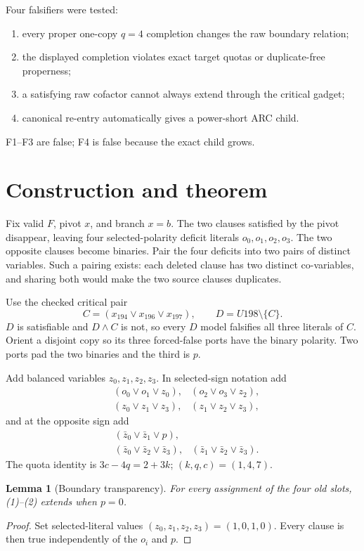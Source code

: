 \documentclass[11pt]{article}
\newtheorem{lemma}{Lemma}
\begin{document}
Four falsifiers were tested:
\begin{enumerate}[label=F\arabic*.]
\item every proper one-copy $q=4$ completion changes the raw boundary relation;
\item the displayed completion violates exact target quotas or duplicate-free properness;
\item a satisfying raw cofactor cannot always extend through the critical gadget;
\item canonical re-entry automatically gives a power-short ARC child.
\end{enumerate}
F1--F3 are false; F4 is false because the exact child grows.

\section{Construction and theorem}

Fix valid $F$, pivot $x$, and branch $x=b$.  The two clauses satisfied by the pivot disappear, leaving four selected-polarity deficit literals $o_0,o_1,o_2,o_3$.  The two opposite clauses become binaries.  Pair the four deficits into two pairs of distinct variables.  Such a pairing exists: each deleted clause has two distinct co-variables, and sharing both would make the two source clauses duplicates.

Use the checked critical pair
\[
C=(x_{194}\vee x_{196}\vee x_{197}),\qquad
D=U198\setminus\{C\}.
\]
$D$ is satisfiable and $D\wedge C$ is not, so every $D$ model falsifies all three literals of $C$.  Orient a disjoint copy so its three forced-false ports have the binary polarity.  Two ports pad the two binaries and the third is $p$.

Add balanced variables $z_0,z_1,z_2,z_3$.  In selected-sign notation add
\begin{align}
&(o_0\vee o_1\vee z_0), &(o_2\vee o_3\vee z_2),\nonumber\\
&(z_0\vee z_1\vee z_3), &(z_1\vee z_2\vee z_3),       \tag{1}
\end{align}
and at the opposite sign add
\begin{align}
&(\bar z_0\vee\bar z_1\vee p),\nonumber\\
&(\bar z_0\vee\bar z_2\vee\bar z_3),
&(\bar z_1\vee\bar z_2\vee\bar z_3).                  \tag{2}
\end{align}
The quota identity is $3c-4q=2+3k$; $(k,q,c)=(1,4,7)$.

\begin{lemma}[Boundary transparency]
For every assignment of the four old slots, (1)--(2) extends when $p=0$.
\end{lemma}
\begin{proof}
Set selected-literal values $(z_0,z_1,z_2,z_3)=(1,0,1,0)$.  Every clause is then true independently of the $o_i$ and $p$.
\end{proof}
\end{document}
